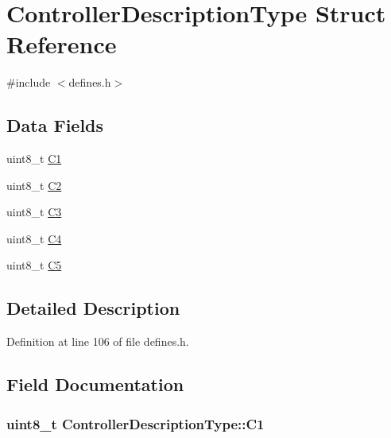 \hypertarget{structControllerDescriptionType}{}\section{Controller\+Description\+Type Struct Reference}
\label{structControllerDescriptionType}


{\ttfamily \#include $<$defines.\+h$>$}

\subsection*{Data Fields}
\begin{DoxyCompactItemize}
\item 
uint8\+\_\+t \hyperlink{structControllerDescriptionType_a042a33e692d7d242a384d8edc94af2f2}{C1}
\item 
uint8\+\_\+t \hyperlink{structControllerDescriptionType_ae2ac8a001bde9c68f92c6bb3a7287517}{C2}
\item 
uint8\+\_\+t \hyperlink{structControllerDescriptionType_ad24f2f797685ffd8f0bc96a800e5a6a8}{C3}
\item 
uint8\+\_\+t \hyperlink{structControllerDescriptionType_abc2badc5707de3327d15a00919fb7e08}{C4}
\item 
uint8\+\_\+t \hyperlink{structControllerDescriptionType_a5b520889371f53fb89e36a0de5f071e9}{C5}
\end{DoxyCompactItemize}


\subsection{Detailed Description}


Definition at line 106 of file defines.\+h.



\subsection{Field Documentation}
\subsubsection[{\texorpdfstring{C1}{C1}}]{\setlength{\rightskip}{0pt plus 5cm}uint8\+\_\+t Controller\+Description\+Type\+::\+C1}\hypertarget{structControllerDescriptionType_a042a33e692d7d242a384d8edc94af2f2}{}\label{structControllerDescriptionType_a042a33e692d7d242a384d8edc94af2f2}


